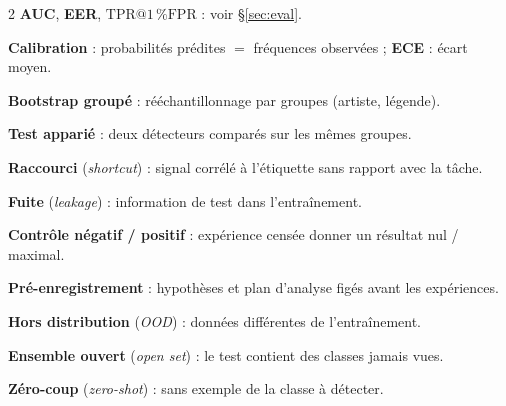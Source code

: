 \documentclass[10pt,a4paper]{article}
\makeatletter
\newcommand{\tprfpr}{\mathrm{TPR}@1\,\%\mathrm{FPR}}
\makeatother
\begin{document}
\begin{multicols}{2}
\textbf{AUC}, \textbf{EER}, \textbf{$\tprfpr$} : voir §\ref{sec:eval}.\par
\textbf{Calibration} : probabilités prédites $=$ fréquences observées ; \textbf{ECE} : écart moyen.\par
\textbf{Bootstrap groupé} : rééchantillonnage par groupes (artiste, légende).\par
\textbf{Test apparié} : deux détecteurs comparés sur les mêmes groupes.\par
\textbf{Raccourci} (\emph{shortcut}) : signal corrélé à l'étiquette sans rapport avec la tâche.\par
\textbf{Fuite} (\emph{leakage}) : information de test dans l'entraînement.\par
\textbf{Contrôle négatif / positif} : expérience censée donner un résultat nul / maximal.\par
\textbf{Pré-enregistrement} : hypothèses et plan d'analyse figés avant les expériences.\par
\textbf{Hors distribution} (\emph{OOD}) : données différentes de l'entraînement.\par
\textbf{Ensemble ouvert} (\emph{open set}) : le test contient des classes jamais vues.\par
\textbf{Zéro-coup} (\emph{zero-shot}) : sans exemple de la classe à détecter.\par
\end{multicols}
\normalsize
\end{document}

